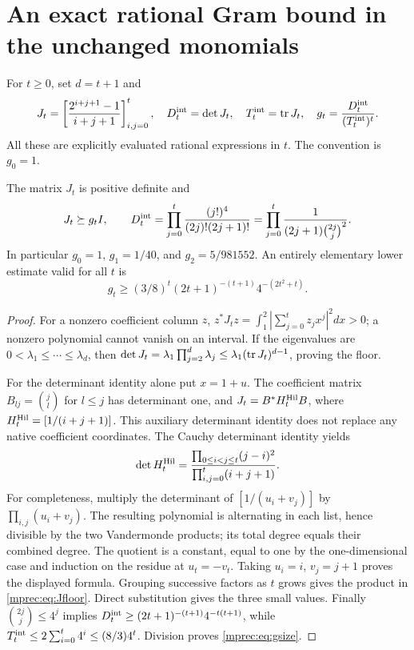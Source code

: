 \section{An exact rational Gram bound in the unchanged monomials}

For $t\ge0$, set $d=t+1$ and
\begin{equation}\label{mprec:eq:J}
 J_t=\left[\frac{2^{i+j+1}-1}{i+j+1}\right]_{i,j=0}^t,
 \quad D_t^{\rm int}=\det J_t,
 \quad T_t^{\rm int}=\operatorname{tr} J_t,
 \quad g_t=\frac{D_t^{\rm int}}{(T_t^{\rm int})^t}.
\end{equation}
All these are explicitly evaluated rational expressions in $t$.
The convention is $g_0=1$.

\begin{mpreclemma}\label{mprec:lem:J}
The matrix $J_t$ is positive definite and
\begin{equation}\label{mprec:eq:Jfloor}
 J_t\succeq g_tI,\qquad
 D_t^{\rm int}=\prod_{j=0}^t
 \frac{(j!)^4}{(2j)!(2j+1)!}
 =\prod_{j=0}^t\frac1{(2j+1)\binom{2j}j^2}.
\end{equation}
In particular $g_0=1$, $g_1=1/40$, and $g_2=5/981552$.
An entirely elementary lower estimate valid for all $t$ is
\begin{equation}\label{mprec:eq:gsize}
 g_t\ge(3/8)^t(2t+1)^{-(t+1)}4^{-(2t^2+t)}.
\end{equation}
\end{mpreclemma}
\begin{proof}
For a nonzero coefficient column $z$,
$z^*J_tz=\int_1^2|\sum_{j=0}^tz_jx^j|^2dx>0$;
a nonzero polynomial cannot vanish on an interval. If the eigenvalues
are $0<\lambda_1\le\cdots\le\lambda_d$, then
$\det J_t=\lambda_1\prod_{j=2}^d\lambda_j
\le\lambda_1(\operatorname{tr} J_t)^{d-1}$, proving the floor.

For the determinant identity alone put $x=1+u$. The coefficient
matrix $B_{lj}=\binom jl$ for $l\le j$ has determinant one, and
$J_t=B^*H_t^{\rm Hil}B$, where
$H_t^{\rm Hil}=[1/(i+j+1)]$. This auxiliary determinant identity
does not replace any native coefficient coordinates. The Cauchy
determinant identity yields
\[
 \det H_t^{\rm Hil}
 =\frac{\prod_{0\le i<j\le t}(j-i)^2}
 {\prod_{i,j=0}^t(i+j+1)}.
\]
For completeness, multiply the determinant of $[1/(u_i+v_j)]$
by $\prod_{i,j}(u_i+v_j)$. The resulting polynomial is alternating
in each list, hence divisible by the two Vandermonde products;
its total degree equals their combined degree. The quotient is a
constant, equal to one by the one-dimensional case and induction
on the residue at $u_t=-v_t$. Taking $u_i=i$, $v_j=j+1$ proves
the displayed formula. Grouping successive factors as $t$ grows
gives the product in \eqref{mprec:eq:Jfloor}. Direct substitution gives
the three small values. Finally $\binom{2j}j\le4^j$ implies
$D_t^{\rm int}\ge(2t+1)^{-(t+1)}4^{-t(t+1)}$, while
$T_t^{\rm int}\le2\sum_{i=0}^t4^i\le(8/3)4^t$.
Division proves \eqref{mprec:eq:gsize}.
\end{proof}

